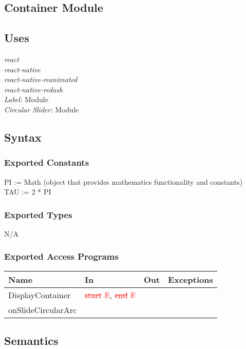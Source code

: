 \documentclass[12pt, titlepage]{article}
\begin{document}
\subsection{Container Module}

\subsection{Uses}
{\textit{react}}\\
{\textit{react-native}}\\
{\textit{react-native-reanimated}}\\
{\textit{react-native-redash}}\\
{\textit{Label:} Module}\\
{\textit{Circular Slider:} Module}

\subsection{Syntax}

\subsubsection{Exported Constants}
PI := Math (object that provides mathematics functionality and constants)\\
TAU := 2 * PI
\subsubsection{Exported Types}
N/A

\subsubsection{Exported Access Programs}

\begin{tabular}{| l | l | l | l |}
	\hline
	{\textbf{Name}} & {\textbf{In}} & {\textbf{Out}} & {\textbf{Exceptions}}\\
	\hline
	{DisplayContainer} & {\textcolor{red}{\sout{start}}} \textcolor{red}{\(\mathbb{R}\)}, {\textcolor{red}{\sout{end}}} \textcolor{red}{\(\mathbb{R}\)} & & \\
	\hline
	{onSlideCircularArc} & & & \\
	\hline
\end{tabular}

\subsection{Semantics}
\end{document}
